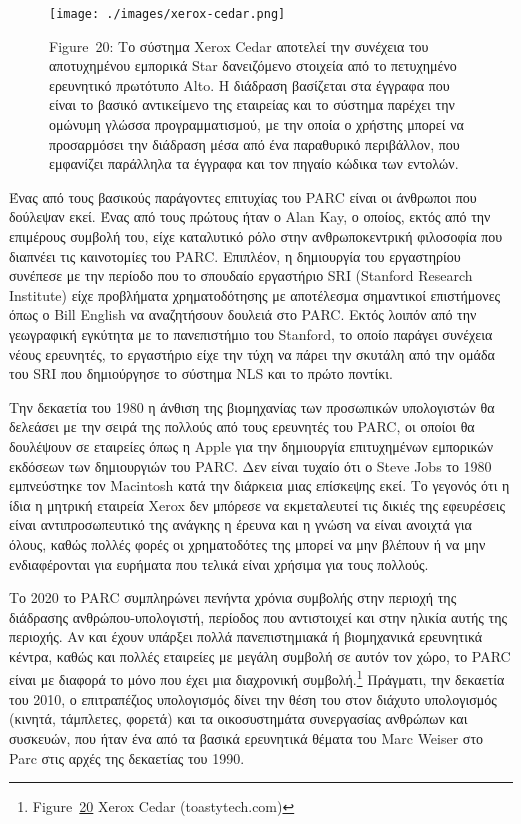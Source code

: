 \documentclass[
]{article}
\begin{document}
\leavevmode{}%
\begin{figure}
\hypertarget{fig:xerox-cedar}{%
\centering
\texttt{[image: ./images/xerox-cedar.png]}
\caption{Figure~20: Το σύστημα Xerox Cedar αποτελεί την συνέχεια του
αποτυχημένου εμπορικά Star δανειζόμενο στοιχεία από το πετυχημένο
ερευνητικό πρωτότυπο Alto. Η διάδραση βασίζεται στα έγγραφα που είναι το
βασικό αντικείμενο της εταιρείας και το σύστημα παρέχει την ομώνυμη
γλώσσα προγραμματισμού, με την οποία ο χρήστης μπορεί να προσαρμόσει την
διάδραση μέσα από ένα παραθυρικό περιβάλλον, που εμφανίζει παράλληλα τα
έγγραφα και τον πηγαίο κώδικα των εντολών.}\label{fig:xerox-cedar}
}
\end{figure}

Ένας από τους βασικούς παράγοντες επιτυχίας του PARC είναι οι άνθρωποι
που δούλεψαν εκεί. Ένας από τους πρώτους ήταν ο Alan Kay, ο οποίος,
εκτός από την επιμέρους συμβολή του, είχε καταλυτικό ρόλο στην
ανθρωποκεντρική φιλοσοφία που διαπνέει τις καινοτομίες του PARC.
Επιπλέον, η δημιουργία του εργαστηρίου συνέπεσε με την περίοδο που το
σπουδαίο εργαστήριο SRI (Stanford Research Institute) είχε προβλήματα
χρηματοδότησης με αποτέλεσμα σημαντικοί επιστήμονες όπως ο Bill English
να αναζητήσουν δουλειά στο PARC. Εκτός λοιπόν από την γεωγραφική
εγκύτητα με το πανεπιστήμιο του Stanford, το οποίο παράγει συνέχεια
νέους ερευνητές, το εργαστήριο είχε την τύχη να πάρει την σκυτάλη από
την ομάδα του SRI που δημιούργησε το σύστημα NLS και το πρώτο ποντίκι.

Την δεκαετία του 1980 η άνθιση της βιομηχανίας των προσωπικών
υπολογιστών θα δελεάσει με την σειρά της πολλούς από τους ερευνητές του
PARC, οι οποίοι θα δουλέψουν σε εταιρείες όπως η Apple για την
δημιουργία επιτυχημένων εμπορικών εκδόσεων των δημιουργιών του PARC. Δεν
είναι τυχαίο ότι ο Steve Jobs το 1980 εμπνεύστηκε τον Macintosh κατά την
διάρκεια μιας επίσκεψης εκεί. Το γεγονός ότι η ίδια η μητρική εταιρεία
Xerox δεν μπόρεσε να εκμεταλευτεί τις δικιές της εφευρέσεις είναι
αντιπροσωπευτικό της ανάγκης η έρευνα και η γνώση να είναι ανοιχτά για
όλους, καθώς πολλές φορές οι χρηματοδότες της μπορεί να μην βλέπουν ή να
μην ενδιαφέρονται για ευρήματα που τελικά είναι χρήσιμα για τους
πολλούς.

Το 2020 το PARC συμπληρώνει πενήντα χρόνια συμβολής στην περιοχή της
διάδρασης ανθρώπου-υπολογιστή, περίοδος που αντιστοιχεί και στην ηλικία
αυτής της περιοχής. Αν και έχουν υπάρξει πολλά πανεπιστημιακά ή
βιομηχανικά ερευνητικά κέντρα, καθώς και πολλές εταιρείες με μεγάλη
συμβολή σε αυτόν τον χώρο, το PARC είναι με διαφορά το μόνο που έχει μια
διαχρονική συμβολή.\footnote{Figure~\protect\hyperlink{fig:xerox-cedar}{20}
  Xerox Cedar (toastytech.com)} Πράγματι, την δεκαετία του 2010, ο
επιτραπέζιος υπολογισμός δίνει την θέση του στον διάχυτο υπολογισμός
(κινητά, τάμπλετες, φορετά) και τα οικοσυστημάτα συνεργασίας ανθρώπων
και συσκευών, που ήταν ένα από τα βασικά ερευνητικά θέματα του Marc
Weiser στο Parc στις αρχές της δεκαετίας του 1990.
\end{document}
